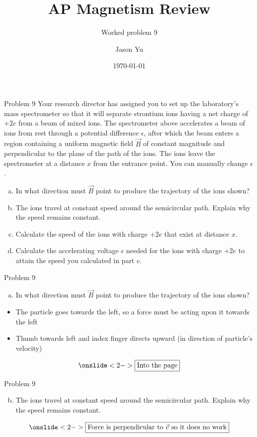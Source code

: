 \documentclass[aspectratio=169]{beamer}
\author{Jason Yu}
\title{AP Magnetism Review}
\subtitle{Worked problem 9}
\institute{University HS}
\date{\today}
\begin{document}
	\begin{frame}{Problem 9}
		Your research director has assigned you to set up the laboratory's mass spectrometer so that it will separate strontium ions having a net charge of \(+2e\) from a beam of mixed ions. The spectrometer above accelerates a beam of ions from rest through a potential difference \(\epsilon\), after which the beam enters a region containing a uniform magnetic field \(\vec{B}\) of constant magnitude and perpendicular to the plane of the path of the ions. The ions leave the spectrometer at a distance \(x\) from the entrance point. You can manually change \(\epsilon\).

		\begin{enumerate}[a)]
			\item In what direction must \(\vec{B}\) point to produce the trajectory of the ions shown?
			\item The ions travel at constant speed around the semicircular path. Explain why the speed remains constant.
			\item Calculate the speed of the ions with charge \(+2e\) that exist at distance \(x\).
			\item Calculate the accelerating voltage \(\epsilon\) needed for the ions with charge \(+2e\) to attain the speed you calculated in part c.
		\end{enumerate}
	\end{frame}

	\begin{frame}{Problem 9}
		\begin{enumerate}[a)]
			\item In what direction must \(\vec{B}\) point to produce the trajectory of the ions shown?
		\end{enumerate}

		\begin{itemize}
			\item The particle goes towards the left, so a force must be acting upon it towards the left
			\item Thumb towards left and index finger directs upward (in direction of particle's velocity)
		\end{itemize}

		\begin{equation*}
			\onslide<2->\boxed{\text{Into the page}}
		\end{equation*}
	\end{frame}

	\begin{frame}{Problem 9}
		\begin{enumerate}[a)]
			\setcounter{enumi}{1}
			\item The ions travel at constant speed around the semicircular path. Explain why the speed remains constant.
		\end{enumerate}

		\begin{equation*}
			\onslide<2->\boxed{\text{Force is perpendicular to } \vec{v} \text{ so it does no work}}
		\end{equation*}
	\end{frame}
\end{document}
